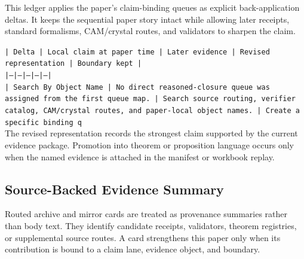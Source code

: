 \documentclass[11pt]{article}
\begin{document}
This ledger applies the paper's claim-binding queues as explicit back-application
deltas. It keeps the sequential paper story intact while allowing later
receipts, standard formalisms, CAM/crystal routes, and validators to sharpen the
claim.

\noindent\texttt{| Delta | Local claim at paper time | Later evidence | Revised representation | Boundary kept |}\\
\noindent\texttt{|---|---|---|---|---|}\\
\noindent\texttt{| Search By Object Name | No direct reasoned-closure queue was assigned from the first queue map. | Search source routing, verifier catalog, CAM/crystal routes, and paper-local object names. | Create a specific binding q}\\

The revised representation records the strongest claim supported by the current evidence package. Promotion into theorem or proposition language occurs only when the named evidence is attached in the manifest or workbook replay.

\subsection*{Source-Backed Evidence Summary}

Routed archive and mirror cards are treated as provenance summaries rather than
body text. They identify candidate receipts, validators, theorem registries, or
supplemental source routes. A card strengthens this paper only when its
contribution is bound to a claim lane, evidence object, and boundary.
\end{document}
